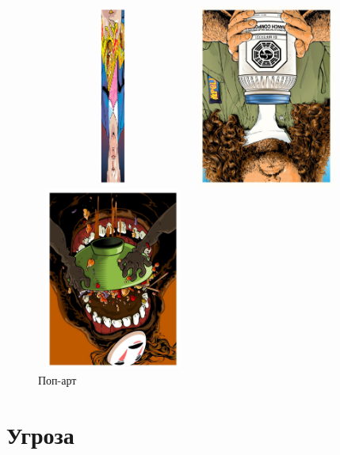 \documentclass[12pt, a4paper]{article}
\begin{document}
\begin{figure}[h!]
\begin{minipage}[h!]{0.3\linewidth}
\end{minipage}
\hfill
\begin{minipage}[h!]{0.3\linewidth}
\includegraphics[height=6cm, width=5cm, angle=180]{pop2.pdf}
\end{minipage}
\hfill
\begin{minipage}[h!]{0.3\linewidth}
\includegraphics[height=6cm, width=5cm, angle=180]{pop10.pdf}
\end{minipage}
\hfill
\begin{minipage}[h!]{0.3\linewidth}
\includegraphics[height=6cm, width=5cm, angle=180]{pop6.pdf}
\end{minipage}
\caption{Поп-арт}
\label{fig:1figs}

\end{figure}

\newpage

\section{Угроза}

{}
\end{document}
